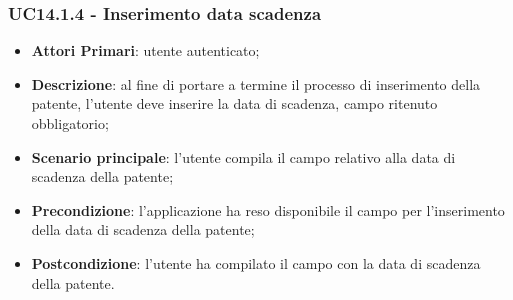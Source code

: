 \subsubsection{UC14.1.4 - Inserimento data scadenza}
\begin{itemize}
	\item \textbf{Attori Primari}: utente autenticato;
	\item \textbf{Descrizione}: al fine di portare a termine il processo di inserimento della patente, l'utente deve inserire la data di scadenza, campo ritenuto obbligatorio; 
	\item \textbf{Scenario principale}: l'utente compila il campo relativo alla data di scadenza della patente;	
	\item \textbf{Precondizione}: l'applicazione ha reso disponibile il campo per l'inserimento della data di scadenza della patente;
	\item \textbf{Postcondizione}: l'utente ha compilato il campo con la data di scadenza della patente.
\end{itemize}
